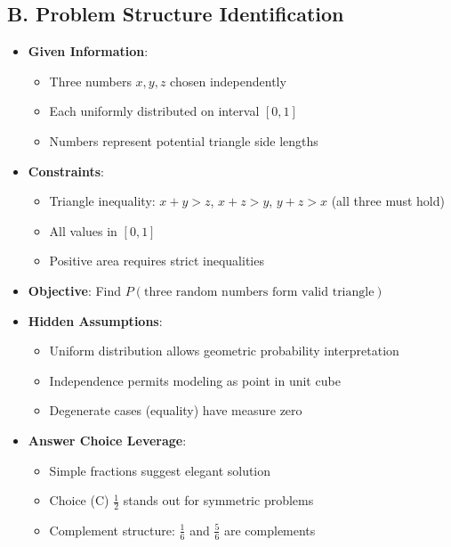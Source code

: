 \documentclass[11pt]{article}
\begin{document}
\begin{problemconfigbox}
\subsection*{B. Problem Structure Identification}
\begin{itemize}[leftmargin=*]
    \item \textbf{Given Information}: 
    \begin{itemize}
        \item Three numbers $x, y, z$ chosen independently
        \item Each uniformly distributed on interval $[0,1]$
        \item Numbers represent potential triangle side lengths
    \end{itemize}
    \item \textbf{Constraints}: 
    \begin{itemize}
        \item Triangle inequality: $x+y>z$, $x+z>y$, $y+z>x$ (all three must hold)
        \item All values in $[0,1]$
        \item Positive area requires strict inequalities
    \end{itemize}
    \item \textbf{Objective}: Find $P(\text{three random numbers form valid triangle})$
    \item \textbf{Hidden Assumptions}: 
    \begin{itemize}
        \item Uniform distribution allows geometric probability interpretation
        \item Independence permits modeling as point in unit cube
        \item Degenerate cases (equality) have measure zero
    \end{itemize}
    \item \textbf{Answer Choice Leverage}: 
    \begin{itemize}
        \item Simple fractions suggest elegant solution
        \item Choice (C) $\frac{1}{2}$ stands out for symmetric problems
        \item Complement structure: $\frac{1}{6}$ and $\frac{5}{6}$ are complements
    \end{itemize}
\end{itemize}


\end{problemconfigbox}
\end{document}
